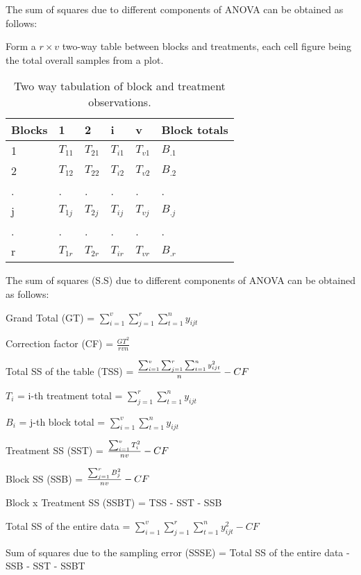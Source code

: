 \documentclass[
  ignorenonframetext,
  aspectratio=169]{beamer}
\begin{document}
\begin{frame}{}
\protect\hypertarget{section-6}{}
\small

The sum of squares due to different components of ANOVA can be obtained
as follows:

Form a \(r \times v\) two-way table between blocks and treatments, each
cell figure being the total overall samples from a plot.

\begin{table}

\caption{\label{tab:two-way-block-treatment}Two way tabulation of block and treatment observations.}
\centering
\fontsize{8}{10}\selectfont
\begin{tabular}[t]{llllll}
\toprule
Blocks & 1 & 2 & i & v & Block totals\\
\midrule
1 & $T_{11}$ & $T_{21}$ & $T_{i1}$ & $T_{v1}$ & $B_{.1}$\\
2 & $T_{12}$ & $T_{22}$ & $T_{i2}$ & $T_{v2}$ & $B_{.2}$\\
. & . & . & . & . & .\\
j & $T_{1j}$ & $T_{2j}$ & $T_{ij}$ & $T_{vj}$ & $B_{.j}$\\
. & . & . & . & . & .\\
\addlinespace
r & $T_{1r}$ & $T_{2r}$ & $T_{ir}$ & $T_{vr}$ & $B_{.r}$\\
\bottomrule
\end{tabular}
\end{table}
\end{frame}

\begin{frame}{}
\protect\hypertarget{section-7}{}
\small

The sum of squares (S.S) due to different components of ANOVA can be
obtained as follows:

Grand Total (GT) =
\(\sum_{i = 1}^v \sum_{j = 1}^r \sum_{t = 1}^n y_{ijt}\)

Correction factor (CF) = \(\frac{GT^2}{rvn}\)

Total SS of the table (TSS) =
\(\large \frac{\sum_{i = 1}^v \sum_{j = 1}^r \sum_{t = 1}^n y_{ijt}^2}{n} - CF\)

\(T_i\) = i-th treatment total =
\(\sum_{j = 1}^r \sum_{t = 1}^n y_{ijt}\)

\(B_i\) = j-th block total = \(\sum_{i = 1}^v \sum_{t = 1}^n y_{ijt}\)

Treatment SS (SST) = \(\large \frac{\sum_{i = 1}^v T_i^2}{nv} - CF\)

Block SS (SSB) = \(\large \frac{\sum_{j = 1}^r B_j^2}{nv} - CF\)

Block x Treatment SS (SSBT) = TSS - SST - SSB

Total SS of the entire data =
\(\sum_{i = 1}^v \sum_{j = 1}^r \sum_{t = 1}^n y_{ijt}^2 - CF\)

Sum of squares due to the sampling error (SSSE) = Total SS of the entire
data - SSB - SST - SSBT
\end{frame}
\end{document}
